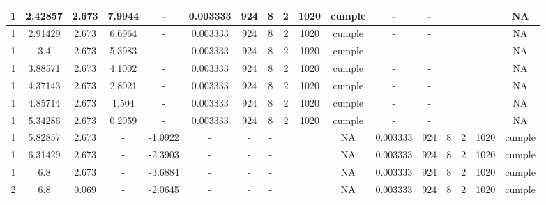 \begin{table}[H]
{\begin{tabular}{|c|c|c|c|c|c|c|c|c|c|c|c|c|c|c|c|c|}
\hline
1   & 2.42857 & 2.673 & 7.9944 & -   & 0.003333 & 924 & 8   & 2   & 1020 & \cellcolor[rgb]{ .776,  .937,  .808}\textcolor[rgb]{ 0,  .38,  0}{cumple} & -   & -   &     &     &     & NA \bigstrut\\
\hline
1   & 2.91429 & 2.673 & 6.6964 & -   & 0.003333 & 924 & 8   & 2   & 1020 & \cellcolor[rgb]{ .776,  .937,  .808}\textcolor[rgb]{ 0,  .38,  0}{cumple} & -   & -   &     &     &     & NA \bigstrut\\
\hline
1   & 3.4 & 2.673 & 5.3983 & -   & 0.003333 & 924 & 8   & 2   & 1020 & \cellcolor[rgb]{ .776,  .937,  .808}\textcolor[rgb]{ 0,  .38,  0}{cumple} & -   & -   &     &     &     & NA \bigstrut\\
\hline
1   & 3.88571 & 2.673 & 4.1002 & -   & 0.003333 & 924 & 8   & 2   & 1020 & \cellcolor[rgb]{ .776,  .937,  .808}\textcolor[rgb]{ 0,  .38,  0}{cumple} & -   & -   &     &     &     & NA \bigstrut\\
\hline
1   & 4.37143 & 2.673 & 2.8021 & -   & 0.003333 & 924 & 8   & 2   & 1020 & \cellcolor[rgb]{ .776,  .937,  .808}\textcolor[rgb]{ 0,  .38,  0}{cumple} & -   & -   &     &     &     & NA \bigstrut\\
\hline
1   & 4.85714 & 2.673 & 1.504 & -   & 0.003333 & 924 & 8   & 2   & 1020 & \cellcolor[rgb]{ .776,  .937,  .808}\textcolor[rgb]{ 0,  .38,  0}{cumple} & -   & -   &     &     &     & NA \bigstrut\\
\hline
1   & 5.34286 & 2.673 & 0.2059 & -   & 0.003333 & 924 & 8   & 2   & 1020 & \cellcolor[rgb]{ .776,  .937,  .808}\textcolor[rgb]{ 0,  .38,  0}{cumple} & -   & -   &     &     &     & NA \bigstrut\\
\hline
1   & 5.82857 & 2.673 & -   & -1.0922 & -   & -   & -   &     &     & NA  & 0.003333 & 924 & 8   & 2   & 1020 & \cellcolor[rgb]{ .776,  .937,  .808}\textcolor[rgb]{ 0,  .38,  0}{cumple} \bigstrut\\
\hline
1   & 6.31429 & 2.673 & -   & -2.3903 & -   & -   & -   &     &     & NA  & 0.003333 & 924 & 8   & 2   & 1020 & \cellcolor[rgb]{ .776,  .937,  .808}\textcolor[rgb]{ 0,  .38,  0}{cumple} \bigstrut\\
\hline
1   & 6.8 & 2.673 & -   & -3.6884 & -   & -   & -   &     &     & NA  & 0.003333 & 924 & 8   & 2   & 1020 & \cellcolor[rgb]{ .776,  .937,  .808}\textcolor[rgb]{ 0,  .38,  0}{cumple} \bigstrut\\
\hline
2   & 6.8 & 0.069 & -   & -2.0645 & -   & -   & -   &     &     & NA  & 0.003333 & 924 & 8   & 2   & 1020 & \cellcolor[rgb]{ .776,  .937,  .808}\textcolor[rgb]{ 0,  .38,  0}{cumple} \bigstrut\\

\end{tabular}}
\end{table}
